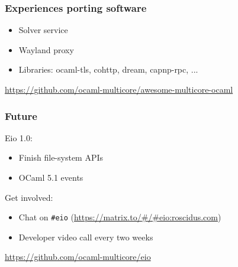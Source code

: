 \documentclass{beamer}
\begin{document}
\begin{frame}
	\frametitle{Experiences porting software}
	\begin{itemize}
		\item Solver service
		\item Wayland proxy
		\item Libraries: ocaml-tls, cohttp, dream, capnp-rpc, ...
	\end{itemize}
	\bigskip
	\url{https://github.com/ocaml-multicore/awesome-multicore-ocaml}
\end{frame}

\begin{frame}[fragile]
	\frametitle{Future}
	Eio 1.0:
	\begin{itemize}
		\item Finish file-system APIs
		\item OCaml 5.1 events
	\end{itemize}
	\bigskip
	Get involved:
	\begin{itemize}
		\item Chat on \verb|#eio| (\url{https://matrix.to/#/#eio:roscidus.com})
		\item Developer video call every two weeks
	\end{itemize}
	\bigskip
	\url{https://github.com/ocaml-multicore/eio}
\end{frame}
\end{document}

